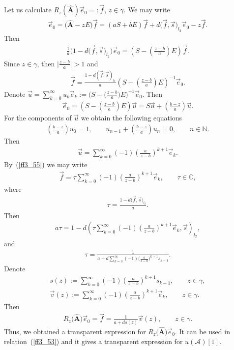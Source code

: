 \documentclass[pdftex]{sigma}
\numberwithin{equation}{section}
\begin{document}
Let us calculate $R_z(\widehat{\mathbf{A}}) \vec e_0 =: \vec f$, $z\in\gamma$. We may write
\begin{gather*} \vec e_0 = \big(\widehat{\mathbf{A}} - zE\big) \vec f = (aS+bE) \vec f + d \big(\vec f,\vec s\big)_{l_2} \vec e_0 - z\vec f. \end{gather*}
Then
\begin{gather*} \frac{1}{a} \big(1- d \big(\vec f,\vec s\big)_{l_2}\big) \vec e_0 = \left( S - \left(\frac{z-b}{a}\right) E \right) \vec f. \end{gather*}
Since $z\in\gamma$, then $\big| \frac{z-b}{a} \big| >1$ and
\begin{gather}\label{ff3_55}
\vec f = \frac{1- d (\vec f,\vec s)_{l_2}}{a} \left( S - \left(\frac{z-b}{a}\right) E \right)^{-1} \vec e_0.
\end{gather}
Denote $\vec u = \sum\limits_{k=0}^\infty u_k \vec e_k := \big( S - \big(\frac{z-b}{a}\big) E \big)^{-1} \vec e_0$. Then
\begin{gather*} \vec e_0 = \left( S - \left(\frac{z-b}{a}\right) E \right) \vec u =S \vec u + \left( \frac{b-z}{a} \right) \vec u. \end{gather*}
For the components of $\vec u$ we obtain the following equations
\begin{gather*} \left( \frac{b-z}{a} \right) u_0 =1,\qquad u_{n-1} + \left( \frac{b-z}{a} \right) u_n = 0,\qquad n\in\mathbb{N}. \end{gather*}
Then
\begin{gather*} \vec u = \sum_{k=0}^\infty (-1) \left( \frac{a}{z-b} \right)^{k+1} \vec e_k. \end{gather*}
By~(\ref{ff3_55}) we may write
\begin{gather*} \vec f = \tau \sum_{k=0}^\infty (-1) \left( \frac{a}{z-b} \right)^{k+1} \vec e_k,\qquad \tau\in\mathbb{C}, \end{gather*}
where
\begin{gather*} \tau = \frac{1- d \big(\vec f,\vec s\big)_{l_2}}{a}. \end{gather*}
Then
\begin{gather*} a \tau = 1- d \left(\tau \sum_{k=0}^\infty (-1) \left( \frac{a}{z-b} \right)^{k+1} \vec e_k,\vec s \right)_{l_2}, \end{gather*}
and
\begin{gather*} \tau = \frac{1}{a + d \sum\limits_{k=0}^\infty (-1)\big( \frac{a}{z-b} \big)^{k+1} s_{k-1}}. \end{gather*}
Denote
\begin{gather*} s(z) := \sum_{k=0}^\infty (-1)\left( \frac{a}{z-b} \right)^{k+1} s_{k-1},\qquad z\in\gamma,\\
\vec v(z) := \sum_{k=0}^\infty (-1)\left( \frac{a}{z-b} \right)^{k+1} \vec e_k,\qquad z\in\gamma. \end{gather*}
Then
\begin{gather*} R_z\big(\widehat{\mathbf{A}}\big) \vec e_0 = \vec f = \frac{1}{a+d s(z)} \vec v(z),\qquad z\in\gamma. \end{gather*}
Thus, we obtained a transparent expression for $R_z\big(\widehat{\mathbf{A}}\big) \vec e_0$. It can be used in relation~(\ref{ff3_53}) and it gives a transparent expression for $u(\mathcal{A}) [1]$.
\end{document}
